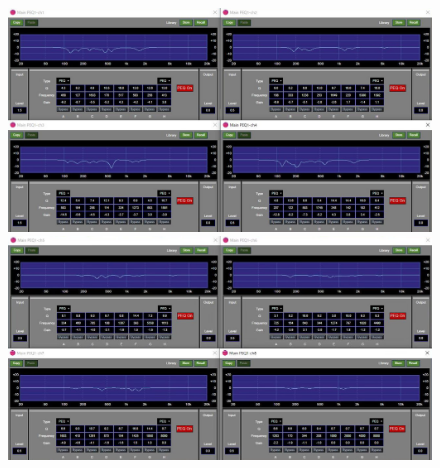 \documentclass[11pt,a4j]{jreport}
\begin{document}
\begin{figure}[H]
  \begin{minipage}[b]{.5\linewidth}
    \centering
    \includegraphics[width=.9\linewidth]{images/experimentField/afcParameters/04delta/03autoEQ1.jpg}
  \end{minipage}%
  \begin{minipage}[b]{.5\linewidth}
    \centering
    \includegraphics[width=.9\linewidth]{images/experimentField/afcParameters/04delta/03autoEQ2.jpg}
  \end{minipage}


\end{figure}
\end{document}
